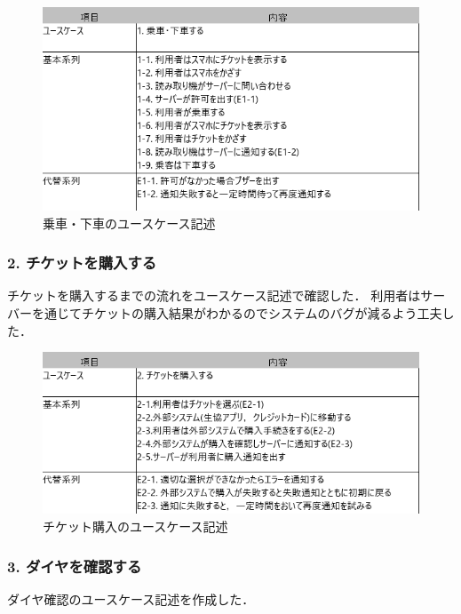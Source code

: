 \documentclass[documentclass]{jsarticle}
\begin{document}
\begin{figure}[H]
  \begin{center}
    \includegraphics*[scale=0.6]{figure/4-1.png}
  \end{center}
  \caption{乗車・下車のユースケース記述}
  \label{fig:4-1}
\end{figure}

\subsubsection*{2. チケットを購入する}
チケットを購入するまでの流れをユースケース記述で確認した．
利用者はサーバーを通じてチケットの購入結果がわかるのでシステムのバグが減るよう工夫した．

\begin{figure}[H]
  \begin{center}
    \includegraphics*[scale=0.6]{figure/4-2.png}
  \end{center}
  \caption{チケット購入のユースケース記述}
  \label{fig:4-2}
\end{figure}

\subsubsection*{3. ダイヤを確認する}
ダイヤ確認のユースケース記述を作成した．
\end{document}
